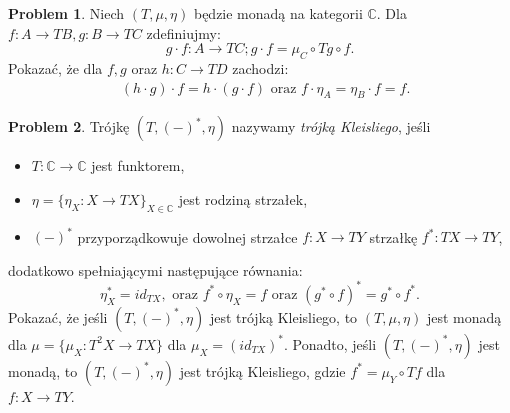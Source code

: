 \documentclass[10pt]{amsart}
\theoremstyle{plain}
\theoremstyle{definition}
\newtheorem{problem}{Problem}
\numberwithin{equation}{section}
\begin{document}
\begin{problem}
  Niech $(T,\mu,\eta)$ będzie monadą na kategorii $\mathbb{C}$. Dla $f:A\to TB, g:B\to TC$ zdefiniujmy:
  $$ g \cdot f :A\to TC; g\cdot f = \mu_C \circ Tg \circ f .$$ 
  Pokazać, że dla $f,g$ oraz $h:C\to TD$ zachodzi:
  \begin{align*}
    & (h\cdot g)\cdot f = h\cdot (g\cdot f) \text{ oraz } f\cdot \eta_A = \eta_B\cdot f = f.  
  \end{align*}
  
\end{problem}

\begin{problem}
 Trójkę $(T,(-)^\ast, \eta)$ nazywamy \emph{trójką Kleisliego}, jeśli
 \begin{itemize}
   \item $T:\mathbb{C}\to \mathbb{C}$ jest funktorem,
   \item $\eta= \{\eta_X:X\to TX\}_{X\in \mathbb{C}}$ jest rodziną strzałek,
   \item $(-)^\ast$ przyporządkowuje dowolnej strzałce $f:X\to TY$ strzałkę $f^\ast :TX\to TY$, 
  \end{itemize}
 dodatkowo spełniającymi następujące równania:
 \[ 
   \eta_X^\ast = id_{TX}, \text{ oraz } f^\ast \circ \eta_X = f \text{ oraz } 
    (g^\ast \circ f)^\ast = g^\ast \circ f^\ast.
 \]
 Pokazać, że jeśli $(T, (-)^\ast, \eta)$ jest trójką Kleisliego, to $(T,\mu,\eta)$ jest monadą dla 
 $\mu = \{\mu_X:T^2X\to TX\}$ dla $\mu_X = (id_{TX})^\ast$. Ponadto, jeśli $(T,(-)^\ast, \eta)$ jest monadą, to $(T,(-)^\ast, \eta)$ jest trójką Kleisliego, gdzie $f^\ast = \mu_Y \circ Tf$ dla $f:X\to TY$. 
\end{problem} 
\end{document}
